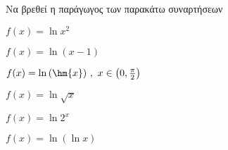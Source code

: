 Να βρεθεί η παράγωγος των παρακάτω συναρτήσεων
\begin{alist}
\item $ f(x)=\ln{x^2} $
\item $ f(x)=\ln{(x-1)} $
\item $ f(x)=\ln{(\hm{x})}\ ,\ x\in\left(0,\frac{\pi}{2}\right) $
\item $ f(x)=\ln{\sqrt{x}} $
\item $ f(x)=\ln{2^x} $
\item $ f(x)=\ln{(\ln{x})} $
\end{alist}
